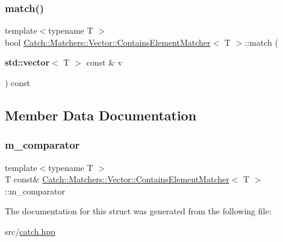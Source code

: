 \mbox{\label{struct_catch_1_1_matchers_1_1_vector_1_1_contains_element_matcher_a95fd99879bcfbe129898bef922c92c17}} 
\subsubsection{\texorpdfstring{match()}{match()}}
{\footnotesize\ttfamily template$<$typename T $>$ \\
bool \hyperlink{struct_catch_1_1_matchers_1_1_vector_1_1_contains_element_matcher}{Catch\+::\+Matchers\+::\+Vector\+::\+Contains\+Element\+Matcher}$<$ T $>$\+::match (\begin{DoxyParamCaption}\item[{\textbf{ std\+::vector}$<$ T $>$ const \&}]{v }\end{DoxyParamCaption}) const\hspace{0.3cm}{\ttfamily [inline]}}



\subsection{Member Data Documentation}
\mbox{\label{struct_catch_1_1_matchers_1_1_vector_1_1_contains_element_matcher_ab7eada6c4bbce1d21b44773262f9cb23}} 
\subsubsection{\texorpdfstring{m\+\_\+comparator}{m\_comparator}}
{\footnotesize\ttfamily template$<$typename T $>$ \\
T const\& \hyperlink{struct_catch_1_1_matchers_1_1_vector_1_1_contains_element_matcher}{Catch\+::\+Matchers\+::\+Vector\+::\+Contains\+Element\+Matcher}$<$ T $>$\+::m\+\_\+comparator}



The documentation for this struct was generated from the following file\+:\begin{DoxyCompactItemize}
\item 
src/\hyperlink{catch_8hpp}{catch.\+hpp}\end{DoxyCompactItemize}
